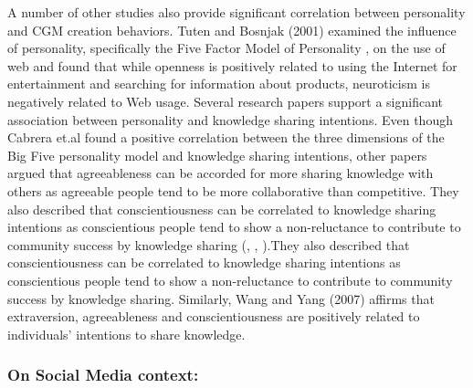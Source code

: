 A number of other studies also provide significant correlation between personality and CGM creation behaviors. Tuten and Bosnjak (2001) examined the influence of personality, specifically the Five Factor Model of Personality \cite{goldberg1990alternative}, on the use of web and found that while openness is positively related to using the Internet for entertainment and searching for information about products, neuroticism is negatively related to Web usage. Several research papers support a significant association between personality and knowledge sharing intentions\cite{cabrera2006determinants}\cite{wang2007personality}\cite{matzler2011personality}\cite{yoo2011influence}. Even though Cabrera et.al found a positive correlation between the three dimensions of the Big Five personality model \cite{goldberg1990alternative} and knowledge sharing intentions, other papers argued that agreeableness can be accorded for more sharing knowledge with others as agreeable people tend to be more collaborative than competitive. They also described that conscientiousness can be correlated to knowledge sharing intentions as conscientious people tend to show a non-reluctance to contribute to community success by knowledge sharing (\cite{matzler2011personality},  \cite{barrick1991big}, \cite{liao2004multilevel}).They also described that conscientiousness can be correlated to knowledge sharing intentions as conscientious people tend to show a non-reluctance to contribute to community success by knowledge sharing. Similarly, Wang and Yang (2007) affirms that extraversion, agreeableness and conscientiousness are positively related to individuals’ intentions to share knowledge\cite{wang2007personality}.


\subsubsection{On Social Media context: }

